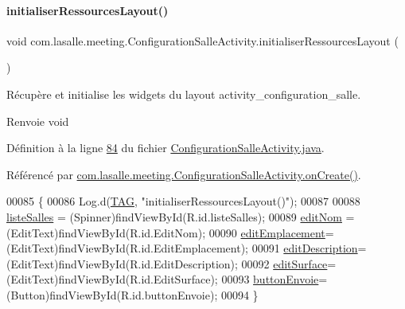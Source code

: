 \paragraph{\texorpdfstring{initialiser\+Ressources\+Layout()}{initialiserRessourcesLayout()}}
{\footnotesize\ttfamily void com.\+lasalle.\+meeting.\+Configuration\+Salle\+Activity.\+initialiser\+Ressources\+Layout (\begin{DoxyParamCaption}{ }\end{DoxyParamCaption})}



Récupère et initialise les widgets du layout activity\+\_\+configuration\+\_\+salle. 

\begin{DoxyReturn}{Renvoie}
void 
\end{DoxyReturn}


Définition à la ligne \hyperlink{_configuration_salle_activity_8java_source_l00084}{84} du fichier \hyperlink{_configuration_salle_activity_8java_source}{Configuration\+Salle\+Activity.\+java}.



Référencé par \hyperlink{_configuration_salle_activity_8java_source_l00066}{com.\+lasalle.\+meeting.\+Configuration\+Salle\+Activity.\+on\+Create()}.


\begin{DoxyCode}
00085     \{
00086         Log.d(\hyperlink{classcom_1_1lasalle_1_1meeting_1_1_configuration_salle_activity_a55224a88c619aa44eb96c0febc3f1857}{TAG}, \textcolor{stringliteral}{"initialiserRessourcesLayout()"});
00087 
00088         \hyperlink{classcom_1_1lasalle_1_1meeting_1_1_configuration_salle_activity_ac1fa67c33882d1f181ba80a061ad097a}{listeSalles} = (Spinner)findViewById(R.id.listeSalles);
00089         \hyperlink{classcom_1_1lasalle_1_1meeting_1_1_configuration_salle_activity_a79f6eb0127fb0182880b9f1eefda39c8}{editNom} = (EditText)findViewById(R.id.EditNom);
00090         \hyperlink{classcom_1_1lasalle_1_1meeting_1_1_configuration_salle_activity_aed6844bdfcc65ccf7b9b9ca1960c6773}{editEmplacement}= (EditText)findViewById(R.id.EditEmplacement);
00091         \hyperlink{classcom_1_1lasalle_1_1meeting_1_1_configuration_salle_activity_a13e08adff1d4f5317a239a0eb9013bd6}{editDescription}= (EditText)findViewById(R.id.EditDescription);
00092         \hyperlink{classcom_1_1lasalle_1_1meeting_1_1_configuration_salle_activity_a75bd76c0944c831ff00668299d8db929}{editSurface}= (EditText)findViewById(R.id.EditSurface);
00093         \hyperlink{classcom_1_1lasalle_1_1meeting_1_1_configuration_salle_activity_a1222b15c71483d1b48ed0eb78724db91}{buttonEnvoie}= (Button)findViewById(R.id.buttonEnvoie);
00094     \}
\end{DoxyCode}
\mbox{\label{classcom_1_1lasalle_1_1meeting_1_1_configuration_salle_activity_ac0b88ac36a5ee40988f3ee8fea7c54ee}} 

